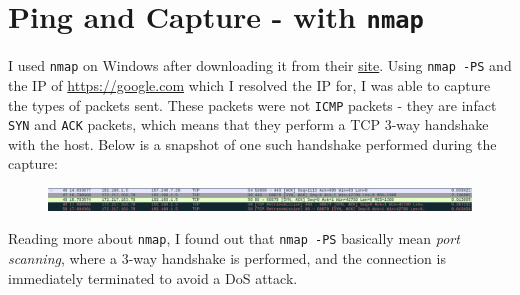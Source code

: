 \documentclass{article}
\begin{document}
\section{Ping and Capture - with \texttt{nmap}}
\begin{flushleft}
I used \texttt{nmap} on Windows after downloading it from their \href{http://nmap.org}{site}. Using \texttt{nmap -PS} and the IP of \url{https://google.com} which I resolved the IP for, I was able to capture the types of packets sent. These packets were not \texttt{ICMP} packets - they are infact \texttt{SYN} and \texttt{ACK} packets, which means that they perform a TCP 3-way handshake with the host. Below is a snapshot of one such handshake performed during the capture:
\begin{figure}[H]
\centering
\includegraphics[width=\linewidth]{nmap-snapshot.png}
\end{figure}

Reading more about \texttt{nmap}, I found out that \texttt{nmap -PS} basically mean \emph{port scanning}, where a 3-way handshake is performed, and the connection is immediately terminated to avoid a DoS attack.
\end{flushleft}
\end{document}
